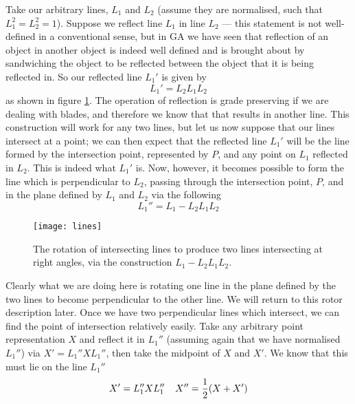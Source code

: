 Take our arbitrary lines, $L_1$ and $L_2$ (assume
they are normalised, such that $L_1^2=L_2^2=1$). Suppose
we reflect line $L_1$ in line $L_2$ --- this statement is
not well-defined in a conventional sense, but in
GA we have seen that reflection of an
object in another object is indeed well defined and is
brought about by sandwiching the object to be reflected
between the object that it is being reflected in. So our
reflected line $L_1'$ is given by
%
\[  L_1' = L_2L_1L_2  \]
%
as shown in figure \ref{intersect_lines}.
The operation of reflection is grade preserving if we are
dealing with blades, and therefore we know that that results in
another line. This construction will work for any two
lines, but let us now suppose that our lines intersect at
a point; we can then expect that the reflected line
$L_1'$ will be the line formed by the intersection point,
represented by $P$, and any point on $L_1$ reflected in $L_2$. This is
indeed what $L_1'$ is. Now, however, it becomes possible
to form the line which is perpendicular to
$L_2$, passing through the intersection point, $P$, and
in the plane defined by $L_1$ and $L_2$ via the following
%
\begin{equation}
 L_1'' =  L_1 - L_2L_1L_2
\end{equation}
%
%
%
\begin{figure}
\centerline{
\texttt{[image: lines]}
} \caption{The rotation of intersecting lines to
produce two lines intersecting at right angles, via the
construction $L_1-L_2L_1L_2$.} \label{intersect_lines}
\end{figure}
Clearly what we are doing here is rotating one line in
the plane defined by the two lines to become perpendicular
to the other line. We will return to this rotor
description later.  Once we have two perpendicular lines
which intersect, we can find the point of intersection
relatively easily. Take any arbitrary point representation $X$ and
reflect it in $L_1''$ (assuming again that we have
normalised $L_1''$) via $X' = L_1''XL_1''$, then take the
midpoint of $X$ and $X'$. We know that this must lie on
the line $L_1''$
%
\[ X' = L_1''XL_1'' \;\;\;\; X'' = \frac{1}{2} (X + X')   \]
